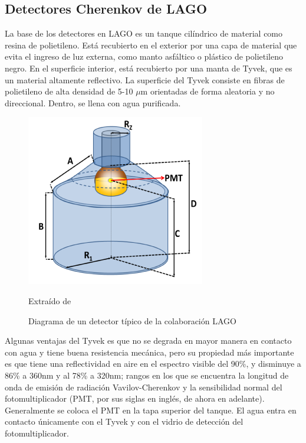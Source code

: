 \documentclass{book}
\begin{document}
\subsection{Detectores Cherenkov de LAGO}

La base de los detectores en LAGO es un tanque cil\'indrico de material como resina de polietileno. Est\'a recubierto en el exterior por una capa de material que evita el ingreso de luz externa, como manto asf\'altico o pl\'astico de polietileno negro. En el superficie interior, est\'a recubierto por una manta de Tyvek, que es un material altamente reflectivo. La superficie del Tyvek consiste en fibras de polietileno de alta densidad de 5-10 $\mu$m orientadas de forma aleatoria y no direccional. Dentro, se llena con agua purificada. \citep{PEREZ} \citep{DUPONT}

\begin{figure}[ht] %
\begin{center}
 \includegraphics[width = 0.5\linewidth]{DetectorLAGO.png}
 
 Extra\'ido de \citep{PEREZ}
\caption{Diagrama de un detector t\'ipico de la colaboraci\'on LAGO}
\end{center}
\end{figure}

Algunas ventajas del Tyvek es que no se degrada en mayor manera en contacto con agua y tiene buena resistencia mec\'anica, pero su propiedad m\'as importante es que tiene una reflectividad en aire en el espectro visible del 90\%, y disminuye a 86\% a 360nm y al 78\% a 320nm; rangos en los que se encuentra la longitud de onda de emisión de radiación Vavilov-Cherenkov y la sensibilidad normal del fotomultiplicador (PMT, por sus siglas en ingl\'es, de ahora en adelante). Generalmente se coloca el PMT en la tapa superior del tanque. El agua entra en contacto \'unicamente con el Tyvek y con el vidrio de detecci\'on del fotomultiplicador. \citep{PEREZ}
\end{document}
